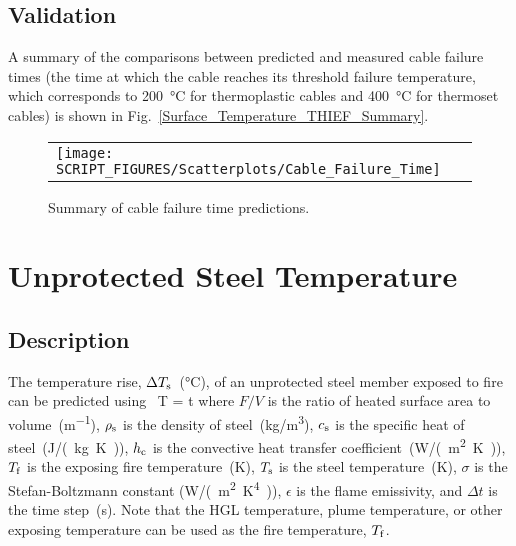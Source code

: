 \clearpage


\subsection*{Validation}

A summary of the comparisons between predicted and measured cable failure times (the time at which the cable reaches its threshold failure temperature, which corresponds to \SI{200}{\celsius} for thermoplastic cables and \SI{400}{\celsius} for thermoset cables) is shown in Fig.~\ref{Surface_Temperature_THIEF_Summary}.

\begin{figure}[!ht]
\begin{center}
\begin{tabular}{l}
\texttt{[image: SCRIPT\_FIGURES/Scatterplots/Cable\_Failure\_Time]}
\end{tabular}
\end{center}
\caption[Summary of cable failure time predictions]
{Summary of cable failure time predictions.}
\label{Cable Failure Time (THIEF)}
\end{figure}

\clearpage


\section{Unprotected Steel Temperature}
\label{sec:Unprotected_Steel_Temperature}

\subsection*{Description}

The temperature rise, $\Delta T\sb{s}$~(\si{\celsius}), of an unprotected steel member exposed to fire can be predicted using~\cite{SFPE:Milke2}
\be
\Delta T =    \Delta t
\label{eq:unprotected_steel}
\ee
where $F/V$ is the ratio of heated surface area to volume~(\si{m^{-1}}), $\rho\sb{s}$ is the density of steel~(\si{kg/m^3}), $c\sb{s}$ is the specific heat of steel~(\si{J/(kg.K)}), $h\sb{c}$ is the convective heat transfer coefficient~(\si{W/(m^2.K)}), $T\sb{f}$ is the exposing fire temperature~(\si{K}), $T\sb{s}$ is the steel temperature~(\si{K}), $\sigma$ is the Stefan-Boltzmann constant (\si{W/(m^2.K^4)}), $\epsilon$ is the flame emissivity, and $\Delta t$ is the time step~(\si{s}). Note that the HGL temperature, plume temperature, or other exposing temperature can be used as the fire temperature, $T\sb{f}$.


